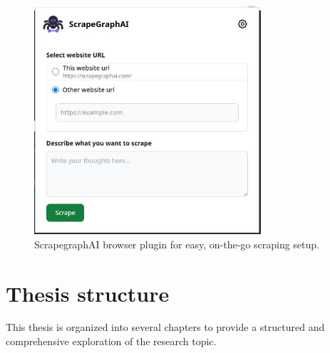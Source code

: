 \begin{figure}[h!]
    \centering
    \includegraphics[width=0.75\textwidth]{Assets/tool.jpg}
    \caption{ScrapegraphAI browser plugin for easy, on-the-go scraping setup.}
    \label{fig:browser-plugin}
\end{figure}

\newpage


\section{Thesis structure}
This thesis is organized into several chapters to provide a structured and comprehensive exploration of the research topic.

